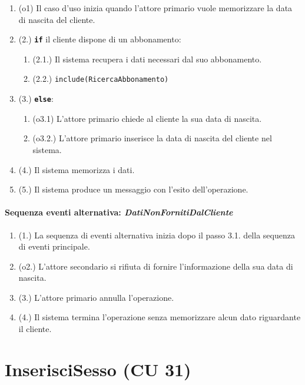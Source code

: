\documentclass{article}
\begin{document}
	\begin{enumerate}[itemsep=8pt,parsep=0pt]
	    \item(o1) Il caso d'uso inizia quando l'attore primario vuole memorizzare la data di nascita del cliente. 
	    \item(2.) \texttt{\textbf{if}} il cliente dispone di un abbonamento:
			\begin{enumerate}	[leftmargin=28pt]
			\item (2.1.) Il sistema recupera i dati necessari dal suo abbonamento. %
			\item (2.2.) \texttt{{include(RicercaAbbonamento)}}
  			\end{enumerate}
  		\item(3.) \texttt{\textbf{else}}:
  		\begin{enumerate}	[leftmargin=28pt]
	        \item(o3.1) L'attore primario chiede al cliente la sua data di nascita.
	        \item(o3.2.) L'attore primario inserisce la data di nascita del cliente nel sistema.
	    \end{enumerate}
		\item(4.) Il sistema memorizza i dati.
		\item(5.) Il sistema produce un messaggio con l'esito dell'operazione.
	\end{enumerate}

	\paragraph{Sequenza eventi alternativa: \emph{DatiNonFornitiDalCliente}}
		\begin{enumerate}[itemsep=8pt,parsep=0pt]
				\item (1.) La sequenza di eventi alternativa inizia dopo il passo 3.1. della sequenza di eventi principale.
				\item (o2.) L'attore secondario si rifiuta di fornire l'informazione della sua data di nascita.
				\item (3.) L'attore primario annulla l'operazione.
				\item (4.) Il sistema termina l'operazione senza memorizzare alcun dato riguardante il cliente.
		\end{enumerate}
	



	
\newpage
\section*{InserisciSesso (CU 31)}
	
\end{document}
